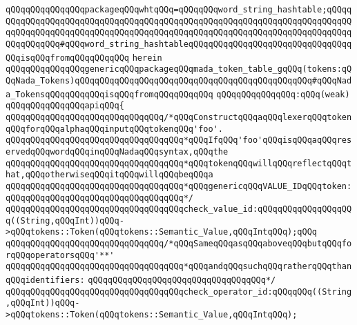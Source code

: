 \verb|qQQqqQQqqQQqqQQqpackageqQQqwhtqQQq=qQQqqQQqword_string_hashtable;qQQqqQQqqQQqqQQqqQQqqQQqqQQqqQQqqQQqqQQqqQQqqQQqqQQqqQQqqQQqqQQqqQQqqQQqqQQqqQQqqQQqqQQqqQQqqQQqqQQqqQQqqQQqqQQqqQQqqQQqqQQqqQQqqQQqqQQqqQQqqQQqqQQqqQQqqQQq#qQQqword_string_hashtableqQQqqQQqqQQqqQQqqQQqqQQqqQQqqQQqqQQqisqQQqfromqQQqqQQqqQQq|\newline
\verb|herein|\newline
\newline
\verb|qQQqqQQqqQQqqQQqgenericqQQqpackageqQQqmada_token_table_gqQQq(tokens:qQQqNada_Tokens)qQQqqQQqqQQqqQQqqQQqqQQqqQQqqQQqqQQqqQQqqQQqqQQq#qQQqNada_TokensqQQqqQQqqQQqisqQQqfromqQQqqQQqqQQq|\newline
\verb|qQQqqQQqqQQqqQQq:qQQq(weak)|\newline
\verb|qQQqqQQqqQQqqQQqapiqQQq{|\newline
\verb|qQQqqQQqqQQqqQQqqQQqqQQqqQQqqQQq/*qQQqConstructqQQqaqQQqlexerqQQqtokenqQQqforqQQqalphaqQQqinputqQQqtokenqQQq'foo'.|\newline
\verb|qQQqqQQqqQQqqQQqqQQqqQQqqQQqqQQqqQQq*qQQqIfqQQq'foo'qQQqisqQQqaqQQqreservedqQQqwordqQQqinqQQqNadaqQQqsyntax,qQQqthe|\newline
\verb|qQQqqQQqqQQqqQQqqQQqqQQqqQQqqQQqqQQq*qQQqtokenqQQqwillqQQqreflectqQQqthat,qQQqotherwiseqQQqitqQQqwillqQQqbeqQQqa|\newline
\verb|qQQqqQQqqQQqqQQqqQQqqQQqqQQqqQQqqQQq*qQQqgenericqQQqVALUE_IDqQQqtoken:|\newline
\verb|qQQqqQQqqQQqqQQqqQQqqQQqqQQqqQQqqQQq*/|\newline
\verb|qQQqqQQqqQQqqQQqqQQqqQQqqQQqqQQqqQQqcheck_value_id:qQQqqQQqqQQqqQQqqQQq((String,qQQqInt))qQQq->qQQqtokens::Token(qQQqtokens::Semantic_Value,qQQqIntqQQq);qQQq|\newline
\newline
\verb|qQQqqQQqqQQqqQQqqQQqqQQqqQQqqQQq/*qQQqSameqQQqasqQQqaboveqQQqbutqQQqforqQQqoperatorsqQQq'**'|\newline
\verb|qQQqqQQqqQQqqQQqqQQqqQQqqQQqqQQqqQQq*qQQqandqQQqsuchqQQqratherqQQqthanqQQqidentifiers:|\newline
\verb|qQQqqQQqqQQqqQQqqQQqqQQqqQQqqQQqqQQq*/|\newline
\verb|qQQqqQQqqQQqqQQqqQQqqQQqqQQqqQQqqQQqcheck_operator_id:qQQqqQQq((String,qQQqInt))qQQq->qQQqtokens::Token(qQQqtokens::Semantic_Value,qQQqIntqQQq);|\newline
